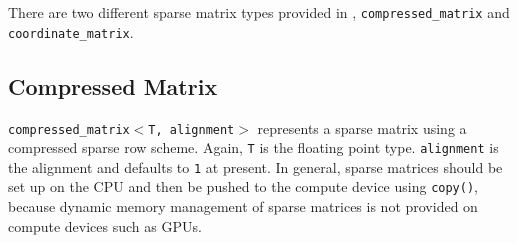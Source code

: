 There are two different sparse matrix types provided in {\ViennaCL}, \texttt{compressed\_matrix} and \texttt{coordinate\_matrix}.


\subsection{Compressed Matrix}
\texttt{compressed\_matrix$<$T, alignment$>$} represents a sparse
matrix using a compressed sparse row scheme. Again, \texttt{T} is the floating point type. \texttt{alignment} is the alignment and defaults to \texttt{1} at present.
In general, sparse matrices should be set up on the
CPU and then be pushed to the compute device using \texttt{copy()}, because dynamic memory management of sparse matrices is not provided on {\OpenCL} compute devices such as GPUs.

